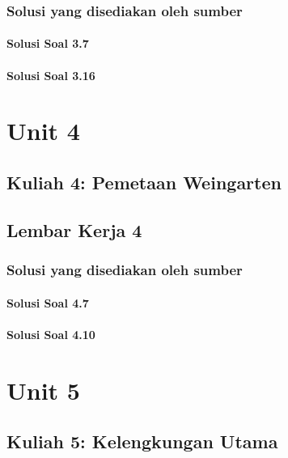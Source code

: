 \documentclass[11pt,a4paper,oneside]{book}
\begin{document}
\section*{Solusi yang disediakan oleh sumber}
\subsection*{Solusi Soal 3.7}

\subsection*{Solusi Soal 3.16}


\part{Unit 4}
\chapter[Kuliah 4]{Kuliah 4: Pemetaan Weingarten}


\chapter{Lembar Kerja 4}


\section*{Solusi yang disediakan oleh sumber}
\subsection*{Solusi Soal 4.7}

\subsection*{Solusi Soal 4.10}


\part{Unit 5}
\chapter[Kuliah 5]{Kuliah 5: Kelengkungan Utama}

\end{document}
